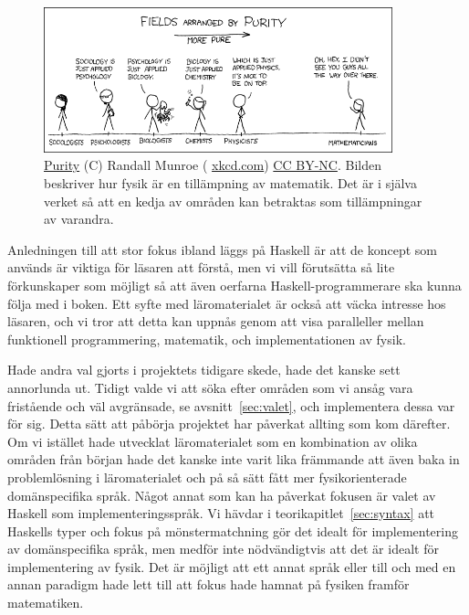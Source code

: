 \begin{figure}[tph]
  \centering
  \includegraphics[width=0.9\textwidth]{figure/purity.png}
  \caption{\href{https://xkcd.com/435/}{Purity} (C) Randall Munroe (
  \href{https://xkcd.com}{xkcd.com}) \href{https://creativecommons.org/licenses/by-nc/2.5/}{CC BY-NC}. Bilden beskriver hur fysik är en tillämpning av matematik. Det är i själva verket
så att en kedja av områden kan betraktas som tillämpningar av
varandra.}\label{fig:xkcd}
\end{figure}

Anledningen till att stor fokus ibland läggs på Haskell är att de
koncept som används är viktiga för läsaren att förstå, men vi vill
förutsätta så lite förkunskaper som möjligt så att även oerfarna
Haskell-programmerare ska kunna följa med i boken. Ett syfte med
läromaterialet är också att väcka intresse hos läsaren, och vi tror
att detta kan uppnås genom att visa paralleller mellan funktionell
programmering, matematik, och implementationen av fysik.

Hade andra val gjorts i projektets tidigare skede, hade det kanske
sett annorlunda ut. Tidigt valde vi att söka efter områden som vi
ansåg vara fristående och väl avgränsade, se avsnitt~\ref{sec:valet},
och implementera dessa var för sig. Detta sätt att påbörja projektet
har påverkat allting som kom därefter. Om vi istället hade utvecklat
läromaterialet som en kombination av olika områden från början hade
det kanske inte varit lika främmande att även baka in problemlösning i
läromaterialet och på så sätt fått mer fysikorienterade domänspecifika
språk. Något annat som kan ha påverkat fokusen är valet av Haskell som
implementeringsspråk. Vi hävdar i teorikapitlet~\ref{sec:syntax} att
Haskells typer och fokus på mönstermatchning gör det idealt för
implementering av domänspecifika språk, men medför inte nödvändigtvis
att det är idealt för implementering av fysik. Det är möjligt att ett
annat språk eller till och med en annan paradigm hade lett till att
fokus hade hamnat på fysiken framför matematiken.

